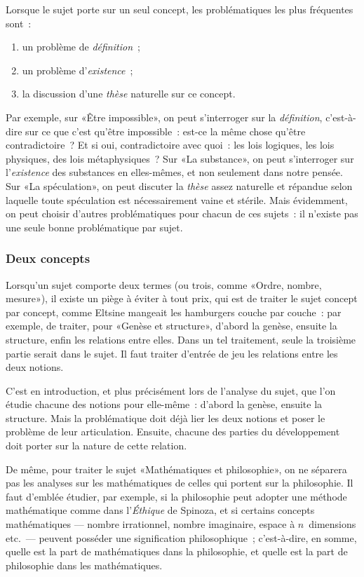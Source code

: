 \documentclass[a4paper,11pt]{article}
\newcommand{\cad}{c'est-à-dire}
\begin{document}
Lorsque le sujet porte sur un seul concept, les problématiques les plus
fréquentes sont~:
\begin{enumerate}
\item un problème de \emph{définition}~;
\item un problème d'\emph{existence}~;
\item la discussion d'une \emph{thèse} naturelle sur ce concept.
\end{enumerate}
Par exemple, sur «Être impossible», on peut s'interroger sur la
\emph{définition}, \cad{} sur ce que c'est qu'être impossible~: est-ce
la même chose qu'être contradictoire~?  Et si oui, contradictoire avec
quoi~: les lois logiques, les lois physiques, des lois métaphysiques~?
Sur «La substance», on peut s'interroger sur l'\emph{existence} des
substances en elles-mêmes, et non seulement dans notre pensée. Sur «La
spéculation», on peut discuter la \emph{thèse} assez naturelle et
répandue selon laquelle toute spéculation est nécessairement vaine et
stérile. Mais évidemment, on peut choisir d'autres problématiques pour
chacun de ces sujets~: il n'existe pas une seule bonne problématique par
sujet.



\subsubsection{Deux concepts}

Lorsqu'un sujet comporte deux termes (ou trois, comme «Ordre, nombre,
mesure»), il existe un piège à éviter à tout prix, qui est de traiter le
sujet concept par concept, comme Eltsine mangeait les hamburgers couche
par couche~: par exemple, de traiter, pour «Genèse et structure»,
d'abord la genèse, ensuite la structure, enfin les relations entre
elles. Dans un tel traitement, seule la troisième partie serait dans le
sujet. Il faut traiter d'entrée de jeu les relations entre les deux
notions.

\par

C'est en introduction, et plus précisément lors de l'analyse du sujet,
que l'on étudie chacune des notions pour elle-même~: d'abord la genèse,
ensuite la structure. Mais la problématique doit déjà lier les deux
notions et poser le problème de leur articulation. Ensuite, chacune des
parties du développement doit porter sur la nature de cette relation.

\par

De même, pour traiter le sujet «Mathématiques et philosophie», on ne
séparera pas les analyses sur les mathématiques de celles qui portent
sur la philosophie. Il faut d'emblée étudier, par exemple, si la
philosophie peut adopter une méthode mathématique comme dans
l'\emph{Éthique} de Spinoza, et si certains concepts mathématiques ---
nombre irrationnel, nombre imaginaire, espace à $n$~dimensions etc.~---
peuvent posséder une signification philosophique~; \cad{}, en somme,
quelle est la part de mathématiques dans la philosophie, et quelle est
la part de philosophie dans les mathématiques.
\end{document}
